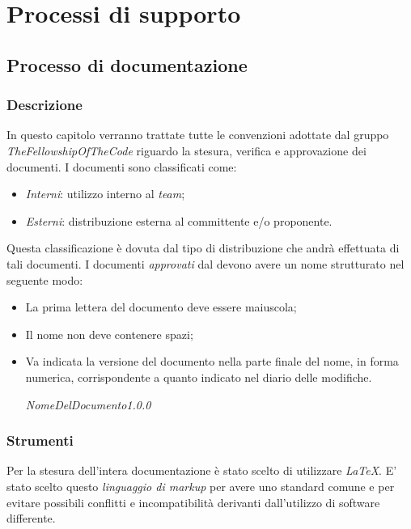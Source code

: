 \section{Processi di supporto}
\subsection{Processo di documentazione}
\subsubsection{Descrizione}
In questo capitolo verranno trattate tutte le convenzioni adottate dal gruppo
\textit{TheFellowshipOfTheCode} riguardo la stesura, verifica e approvazione dei
documenti.
I documenti sono classificati come:
\begin{itemize}
  \item \textit{Interni}: utilizzo interno al \textit{team};
  \item \textit{Esterni}: distribuzione esterna al committente e/o proponente.
\end{itemize}
Questa classificazione è dovuta dal tipo di distribuzione che andrà effettuata di tali documenti.
I documenti \textit{approvati} dal \textit{\RdP} devono avere un nome strutturato nel seguente modo:
\begin{itemize}
  \item La prima lettera del documento deve essere maiuscola;
  \item Il nome non deve contenere spazi;
  \item Va indicata la versione del documento nella parte finale del nome, in forma numerica,
  corrispondente a quanto indicato nel diario delle modifiche.
  \begin{center}
  \textit{NomeDelDocumento1.0.0}
  \end{center}
\end{itemize}
\subsubsection{Strumenti}
Per la stesura dell'intera documentazione è stato scelto di utilizzare \textit{\LaTeX{}}.
E' stato scelto questo \textit{linguaggio di markup} per avere uno
standard comune e per evitare possibili conflitti e incompatibilità derivanti
dall'utilizzo di software differente.

